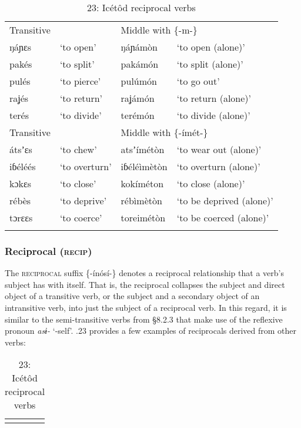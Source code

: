 \begin{table}
\begin{table}
\begin{tabularx}{\textwidth}{XXXX}
Transitive &  & \multicolumn{2}{X}{Middle with \{-m-\}}\\
ŋáɲɛs & ‘to open’ & ŋáɲámòn & ‘to open (alone)’\\
pakés & ‘to split’ & pakámón & ‘to split (alone)’\\
pulés & ‘to pierce’ & pulúmón & ‘to go out’\\
raʝés & ‘to return’ & raʝámón & ‘to return (alone)’\\
terés & ‘to divide’ & terémón & ‘to divide (alone)’\\
Transitive &  & \multicolumn{2}{X}{Middle with \{-ímét-\}}\\
átsʼɛs & ‘to chew’ & atsʼímétòn & ‘to wear out (alone)’\\
iɓéléés & ‘to overturn’ & iɓéléìmètòn & ‘to overturn (alone)’\\
kɔkɛs & ‘to close’ & kokíméton & ‘to close (alone)’\\
rébès & ‘to deprive’ & rébìmètòn & ‘to be deprived (alone)’\\
tɔrɛɛs & \multicolumn{1}{X}{‘to coerce’} & toreimétòn & ‘to be coerced (alone)’\\
\lspbottomrule
\end{tabularx}
\end{table}

\subsubsection{Reciprocal (\textsc{recip})}

The \textsc{reciprocal }suffix \{-ínósí-\} denotes a reciprocal relationship that a verb’s subject has with itself. That is, the reciprocal collapses the subject and direct object of a transitive verb, or the subject and a secondary object of an intransitive verb, into just the subject of a reciprocal verb. In this regard, it is similar to the semi-transitive verbs from §8.2.3 that make use of the reflexive pronoun \textit{asɨ- }‘-self’. .23 provides a few examples of reciprocals derived from other verbs:


\begin{table}
\caption{23: Icétôd reciprocal verbs}
\label{tab:8}


\begin{tabularx}{\textwidth}{XXXX}
\lsptoprule


\end{tabularx}
\end{table}
\end{table}
